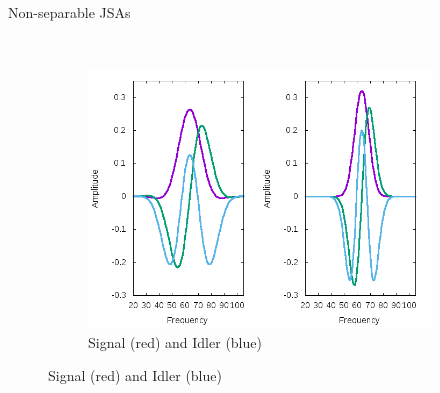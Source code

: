 \documentclass{beamer}
\begin{document}
\begin{frame}{Non-separable JSAs} 
    \begin{figure}
        \centering
        \begin{subfigure}{0.45\textwidth}
        \end{subfigure}
        ~
        \begin{subfigure}{0.45\textwidth}
        \includegraphics[width=1\textwidth]{singlesigidler_entangled_hermitegauss.png}
        \caption{Signal (red) and Idler (blue)}
        \end{subfigure}
    \end{figure}

\end{frame} 
\end{document}
